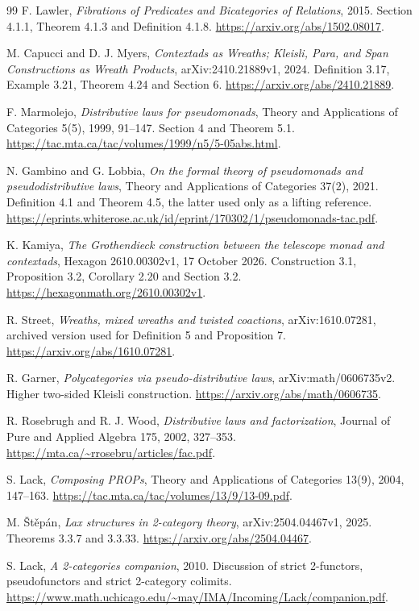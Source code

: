 \documentclass[11pt]{article}
\theoremstyle{definition}
\begin{document}
\begin{thebibliography}{99}
F. Lawler, \emph{Fibrations of Predicates and Bicategories of Relations},
2015. Section 4.1.1, Theorem 4.1.3 and Definition 4.1.8.
\url{https://arxiv.org/abs/1502.08017}.

M. Capucci and D. J. Myers, \emph{Contextads as Wreaths; Kleisli, Para, and
Span Constructions as Wreath Products}, arXiv:2410.21889v1, 2024.
Definition 3.17, Example 3.21, Theorem 4.24 and Section 6.
\url{https://arxiv.org/abs/2410.21889}.

F. Marmolejo, \emph{Distributive laws for pseudomonads}, Theory and
Applications of Categories 5(5), 1999, 91--147. Section 4 and Theorem 5.1.
\url{https://tac.mta.ca/tac/volumes/1999/n5/5-05abs.html}.

N. Gambino and G. Lobbia, \emph{On the formal theory of pseudomonads and
pseudodistributive laws}, Theory and Applications of Categories 37(2), 2021.
Definition 4.1 and Theorem 4.5, the latter used only as a lifting reference.
\url{https://eprints.whiterose.ac.uk/id/eprint/170302/1/pseudomonads-tac.pdf}.

K. Kamiya, \emph{The Grothendieck construction between the telescope monad
and contextads}, Hexagon 2610.00302v1, 17 October 2026.
Construction 3.1, Proposition 3.2, Corollary 2.20 and Section 3.2.
\url{https://hexagonmath.org/2610.00302v1}.

R. Street, \emph{Wreaths, mixed wreaths and twisted coactions},
arXiv:1610.07281, archived version used for Definition 5 and Proposition 7.
\url{https://arxiv.org/abs/1610.07281}.

R. Garner, \emph{Polycategories via pseudo-distributive laws},
arXiv:math/0606735v2. Higher two-sided Kleisli construction.
\url{https://arxiv.org/abs/math/0606735}.

R. Rosebrugh and R. J. Wood, \emph{Distributive laws and factorization},
Journal of Pure and Applied Algebra 175, 2002, 327--353.
\url{https://mta.ca/~rrosebru/articles/fac.pdf}.

S. Lack, \emph{Composing PROPs}, Theory and Applications of Categories
13(9), 2004, 147--163.
\url{https://tac.mta.ca/tac/volumes/13/9/13-09.pdf}.

M. \v{S}t\v{e}p\'an, \emph{Lax structures in 2-category theory},
arXiv:2504.04467v1, 2025. Theorems 3.3.7 and 3.3.33.
\url{https://arxiv.org/abs/2504.04467}.

S. Lack, \emph{A 2-categories companion}, 2010.
Discussion of strict 2-functors, pseudofunctors and strict 2-category colimits.
\url{https://www.math.uchicago.edu/~may/IMA/Incoming/Lack/companion.pdf}.
\end{thebibliography}
\end{document}

